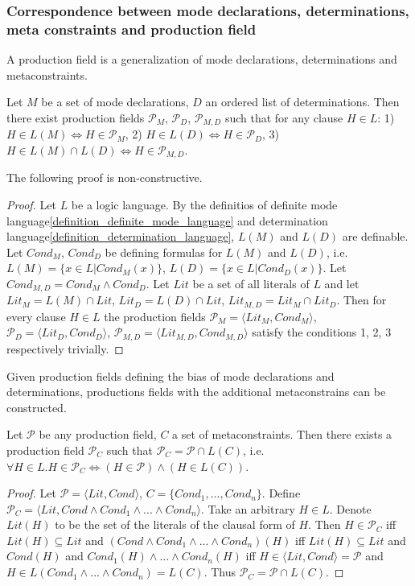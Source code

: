 \subsubsection{Correspondence between mode declarations, determinations, meta constraints and production field}
A production field is a generalization of mode declarations, determinations and metaconstraints.

\begin{proposition}\label{md_d_pf_correspondence_proposition}
Let $M$ be a set of mode declarations, $D$ an ordered list of determinations. Then there exist production fields
$\mathcal{P}_M$,
$\mathcal{P}_D$,
$\mathcal{P}_{M,D}$
such that for any clause $H \in L$:
1) $H \in L(M) \iff H \in \mathcal{P}_M$,
2) $H \in L(D) \iff H \in \mathcal{P}_D$,
3) $H \in L(M) \cap L(D) \iff H \in \mathcal{P}_{M,D}$.
\end{proposition}
The following proof is non-constructive.
\begin{proof}
Let $L$ be a logic language. By the definitios of definite mode language\ref{definition_definite_mode_language} and determination language\ref{definition_determination_language}, $L(M)$ and $L(D)$ are definable.
Let $Cond_M$, $Cond_D$ be defining formulas for $L(M)$ and $L(D)$, i.e. $L(M)=\{x \in L | Cond_M(x)\}$, $L(D)=\{x \in L | Cond_D(x)\}$.
Let $Cond_{M,D}=Cond_M \land Cond_D$. Let $Lit$ be a set of all literals of $L$ and let
$Lit_M=L(M) \cap Lit$,
$Lit_D=L(D) \cap Lit$,
$Lit_{M,D}=Lit_M \cap Lit_D$.
Then for every clause $H \in L$ the production fields
$\mathcal{P}_M=\langle Lit_M, Cond_M \rangle$,
$\mathcal{P}_D=\langle Lit_D, Cond_D \rangle$,
$\mathcal{P}_{M,D}=\langle Lit_{M,D}, Cond_{M,D} \rangle$
satisfy the conditions 1, 2, 3 respectively trivially.
\end{proof}

Given production fields defining the bias of mode declarations and determinations, productions fields with the additional metaconstrains can be constructed.

\begin{proposition}\label{proposition_metaconstraints_production_field}
Let $\mathcal{P}$ be any production field, $C$ a set of metaconstraints.
Then there exists a production field $\mathcal{P}_C$ such that
$\mathcal{P}_C=\mathcal{P} \cap L(C)$, i.e.
$\forall H \in L. H \in \mathcal{P}_C \iff (H \in \mathcal{P}) \land (H \in L(C))$.
\end{proposition}
\begin{proof}
Let $\mathcal{P}=\langle Lit, Cond \rangle$,
$C=\{Cond_1, ..., Cond_n\}$.
Define $\mathcal{P}_C=\langle Lit, Cond \land Cond_1 \land ... \land Cond_n \rangle$. Take an arbitrary $H \in L$. Denote $Lit(H)$ to be the set of the literals of the clausal form of $H$.
Then $H \in \mathcal{P}_C$ iff $Lit(H) \subseteq Lit$ and
$(Cond \land Cond_1 \land ... \land Cond_n)(H)$ iff
$Lit(H) \subseteq Lit$ and $Cond(H)$ and $Cond_1(H) \land ... \land Cond_n(H)$
iff $H \in \langle Lit, Cond \rangle = \mathcal{P}$ and $H \in L(Cond_1 \land ... \land Cond_n) = L(C)$. Thus $\mathcal{P}_C=\mathcal{P} \cap L(C)$.
\end{proof}

